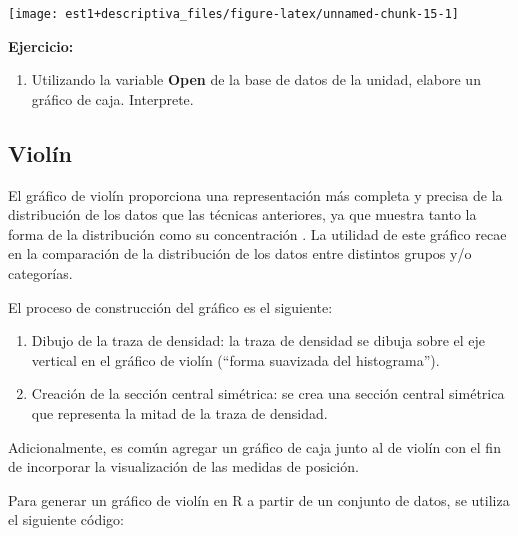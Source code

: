 \documentclass[
]{book}
\providecommand{\tightlist}{%
  \setlength{\itemsep}{0pt}\setlength{\parskip}{0pt}}
\begin{document}
\begin{center}\texttt{[image: est1+descriptiva\_files/figure-latex/unnamed-chunk-15-1]} \end{center}

\textbf{Ejercicio:}

\begin{enumerate}
\def\labelenumi{\arabic{enumi}.}
\tightlist
\item
  Utilizando la variable \textbf{Open} de la base de datos de la unidad, elabore un gráfico de caja. Interprete.
\end{enumerate}

\hypertarget{violuxedn}{%
\subsection{Violín}\label{violuxedn}}

El gráfico de violín proporciona una representación más completa y precisa de la distribución de los datos que las técnicas anteriores, ya que muestra tanto la forma de la distribución como su concentración \citep{hintze1998violin}. La utilidad de este gráfico recae en la comparación de la distribución de los datos entre distintos grupos y/o categorías.

El proceso de construcción del gráfico es el siguiente:

\begin{enumerate}
\def\labelenumi{\arabic{enumi}.}
\tightlist
\item
  Dibujo de la traza de densidad: la traza de densidad se dibuja sobre el eje vertical en el gráfico de violín (``forma suavizada del histograma'').
\item
  Creación de la sección central simétrica: se crea una sección central simétrica que representa la mitad de la traza de densidad.
\end{enumerate}

Adicionalmente, es común agregar un gráfico de caja junto al de violín con el fin de incorporar la visualización de las medidas de posición.

Para generar un gráfico de violín en R a partir de un conjunto de datos, se utiliza el siguiente código:
\end{document}
